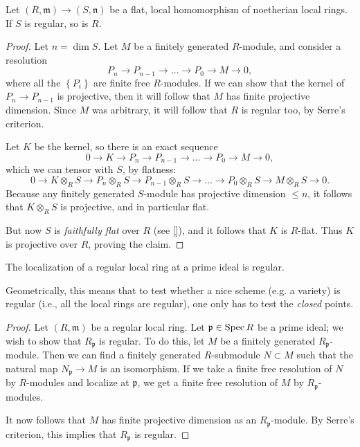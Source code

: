 \begin{proposition} 
Let $(R, \mathfrak{m}) \to (S, \mathfrak{n})$ be a flat, local homomorphism of noetherian local
rings. If $S$ is regular, so is $R$.
\end{proposition} 
\begin{proof} 
Let $n = \dim S$.
Let $M$ be a finitely generated $R$-module, and consider a resolution
\[ P_n \to P_{n-1} \to \dots \to P_0 \to M \to 0,  \]
where all the $\left\{P_i\right\}$ are finite free $R$-modules. If we can show
that the kernel of $P_n \to P_{n-1}$ is projective, then it will follow that
$M$ has finite projective dimension. Since $M$ was arbitrary, it will follow
that $R$ is regular too, by Serre's criterion.

Let $K$ be the kernel, so there is an exact sequence
\[ 0 \to K \to  P_n \to P_{n-1} \to \dots \to P_0 \to M \to 0, \]
which we can tensor with $S$, by flatness:
\[ 0 \to K \otimes_R S \to  P_n \otimes_R S  \to P_{n-1} \otimes_R S \to \dots
\to P_0 \otimes_R S  \to M \otimes_R S\to 0. \]
Because any finitely generated $S$-module has projective dimension $\leq n$, it
follows that $K \otimes_R S$ is projective, and in particular flat.

But now $S$ is \emph{faithfully flat} over $R$ (see \cref{}), and it follows
that $K $ is $R$-flat. Thus $K$ is projective over $R$, proving the claim. 
\end{proof} 

\begin{theorem} 
The localization of a regular local ring at a prime ideal is regular. 
\end{theorem} 
Geometrically, this means that  to test whether a nice scheme (e.g. a variety) is regular
(i.e., all the local rings are regular), one only has to test the \emph{closed}
points.
\begin{proof} 
Let $(R, \mathfrak{m})$ be a regular local ring. Let $\mathfrak{p} \in \operatorname{Spec} R$
be a prime ideal; we wish to show that $R_{\mathfrak{p}}$ is regular. 
To do this, let $M$ be a finitely generated $R_{\mathfrak{p}}$-module. Then we
can find a finitely generated $R$-submodule $N \subset M$ such that 
the natural map $N_{\mathfrak{p}} \to M$ is an isomorphism.
If we take a finite free resolution of $N$ by $R$-modules and localize at
$\mathfrak{p}$, we get a finite free resolution of $M$ by
$R_{\mathfrak{p}}$-modules. 

It now follows that $M$ has finite projective dimension as an
$R_{\mathfrak{p}}$-module. By Serre's criterion, this implies that
$R_{\mathfrak{p}}$ is regular. 
\end{proof} 

